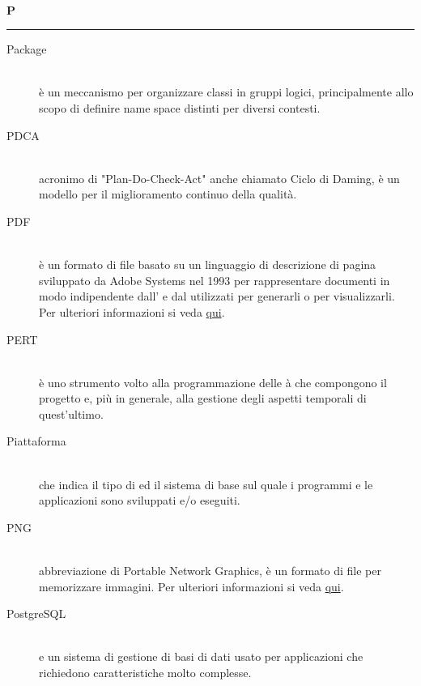 \documentclass[12pt,a4paper]{article}
\begin{document}
\newpage

\begin{center}
\hfill\\
	\LARGE \textbf{P}
\hfill\\
\rule[15pt]{30pt}{0.5pt}
\end{center}

\begin{description}
\item[Package] 
\hfill\\è un meccanismo per organizzare classi  in gruppi logici, principalmente allo scopo di definire name space distinti per diversi contesti.

\item[PDCA] 
\hfill\\ acronimo di "Plan-Do-Check-Act" anche chiamato Ciclo di Daming, è un modello per il miglioramento continuo della qualità.

\item[PDF] 
\hfill\\ è un formato di file basato su un linguaggio di descrizione di pagina sviluppato da Adobe Systems nel 1993 per rappresentare documenti in modo indipendente dall’ e dal  utilizzati per generarli o per visualizzarli. Per ulteriori informazioni si veda \href{http://it.wikipedia.org/wiki/Portable_Document_Format}{qui}.

\item[PERT] 
\hfill\\ è uno strumento volto alla programmazione delle à che compongono il progetto e, più in generale, alla gestione degli aspetti temporali di quest'ultimo.

\item[Piattaforma] 
\hfill\\ che indica il tipo di  ed il sistema  di base sul quale i programmi e le applicazioni sono sviluppati e/o eseguiti.

\item[PNG] 
\hfill\\ abbreviazione di Portable Network Graphics, è un formato di file per memorizzare immagini. Per ulteriori informazioni si veda \href{http://it.wikipedia.org/wiki/Portable_Network_Graphics}{qui}.

\item[PostgreSQL] 
\hfill\\ e un sistema di gestione di basi di dati  usato per applicazioni che richiedono caratteristiche molto complesse.


\end{description}
\end{document}
